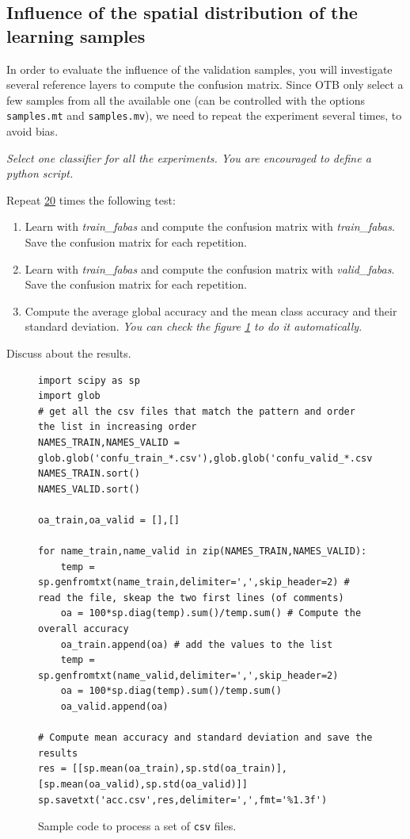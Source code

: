 \documentclass[a4paper,11pt,DIV=18]{scrartcl}
\begin{document}
\subsection{Influence of the spatial distribution of the learning samples}
\label{sec:org06795d2}
In order to evaluate the influence of the validation samples, you will
investigate  several   reference  layers  to  compute   the  confusion
matrix. Since OTB only select a few samples from all the available one
(can be  controlled with  the options  \texttt{samples.mt} and  \texttt{samples.mv}), we
need to repeat the experiment several times, to avoid bias.

\emph{Select one classifier  for all the experiments. You  are encouraged to
define a python script.}

\begin{work}
Repeat \uline{20} times the following test:
\begin{enumerate}
\item Learn with \emph{train\_fabas} and compute the confusion matrix with
\emph{train\_fabas}. Save the confusion matrix for each repetition.
\item Learn  with  \emph{train\_fabas}  and compute  the  confusion  matrix  with
\emph{valid\_fabas}. Save the confusion matrix for each repetition.
\item Compute the average global accuracy and the mean class accuracy and
their standard deviation. \emph{You can check the figure \ref{orge72e9ad} to do it automatically}.
\end{enumerate}


Discuss about the results. 
\end{work}

\begin{figure}
\begin{verbatim}
import scipy as sp
import glob
# get all the csv files that match the pattern and order the list in increasing order
NAMES_TRAIN,NAMES_VALID = glob.glob('confu_train_*.csv'),glob.glob('confu_valid_*.csv')
NAMES_TRAIN.sort()
NAMES_VALID.sort()

oa_train,oa_valid = [],[]

for name_train,name_valid in zip(NAMES_TRAIN,NAMES_VALID):
    temp = sp.genfromtxt(name_train,delimiter=',',skip_header=2) # read the file, skeap the two first lines (of comments)
    oa = 100*sp.diag(temp).sum()/temp.sum() # Compute the overall accuracy
    oa_train.append(oa) # add the values to the list
    temp = sp.genfromtxt(name_valid,delimiter=',',skip_header=2)
    oa = 100*sp.diag(temp).sum()/temp.sum()
    oa_valid.append(oa)
    
# Compute mean accuracy and standard deviation and save the results
res = [[sp.mean(oa_train),sp.std(oa_train)],[sp.mean(oa_valid),sp.std(oa_valid)]]
sp.savetxt('acc.csv',res,delimiter=',',fmt='%1.3f')
\end{verbatim}
\caption{\label{orge72e9ad}
Sample code to process a set of \texttt{csv} files.}
\end{figure}
\end{document}
